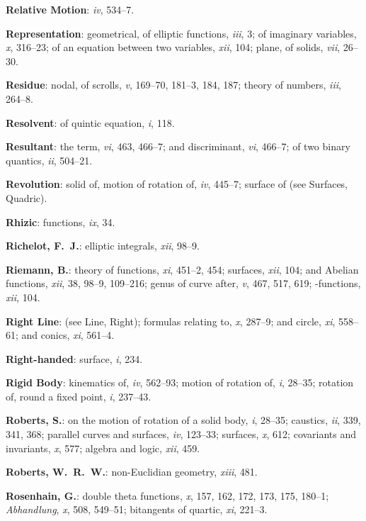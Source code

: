 \documentclass[11pt,a4paper]{article}
\newcommand{\IndexEntry}[1]{\textbf{#1}}
\newcommand{\V}[1]{\textit{#1}} %
\begin{document}
\IndexEntry{Relative Motion}: \V{iv}, 534--7.

\IndexEntry{Representation}: geometrical, of elliptic functions, \V{iii}, 3; of imaginary variables, \V{x}, 316--23; of an equation between two variables, \V{xii}, 104; plane, of solids, \V{vii}, 26--30.

\newpage

\setcounter{page}{121}

\IndexEntry{Residue}: nodal, of scrolls, \V{v}, 169--70, 181--3, 184, 187; theory of numbers, \V{iii}, 264--8.

\IndexEntry{Resolvent}: of quintic equation, \V{i}, 118.

\IndexEntry{Resultant}: the term, \V{vi}, 463, 466--7; and discriminant, \V{vi}, 466--7; of two binary quantics, \V{ii}, 504--21.

\IndexEntry{Revolution}: solid of, motion of rotation of, \V{iv}, 445--7; surface of (see Surfaces, Quadric).

\IndexEntry{Rhizic}: functions, \V{ix}, 34.

\IndexEntry{Richelot, F.\ J.}: elliptic integrals, \V{xii}, 98--9.

\IndexEntry{Riemann, B.}: theory of functions, \V{xi}, 451--2, 454; surfaces, \V{xii}, 104; and Abelian functions, \V{xii}, 38, 98--9, 109--216; genus of curve after, \V{v}, 467, 517, 619; \vartheta-functions, \V{xii}, 104.

\IndexEntry{Right Line}: (see Line, Right); formulas relating to, \V{x}, 287--9; and circle, \V{xi}, 558--61; and conics, \V{xi}, 561--4.

\IndexEntry{Right-handed}: surface, \V{i}, 234.

\IndexEntry{Rigid Body}: kinematics of, \V{iv}, 562--93; motion of rotation of, \V{i}, 28--35; rotation of, round a fixed point, \V{i}, 237--43.

\IndexEntry{Roberts, S.}: on the motion of rotation of a solid body, \V{i}, 28--35; caustics, \V{ii}, 339, 341, 368; parallel curves and surfaces, \V{iv}, 123--33; surfaces, \V{x}, 612; covariants and invariants, \V{x}, 577; algebra and logic, \V{xii}, 459.

\IndexEntry{Roberts, W.\ R.\ W.}: non-Euclidian geometry, \V{xiii}, 481.

\IndexEntry{Rosenhain, G.}: double theta functions, \V{x}, 157, 162, 172, 173, 175, 180--1; \textit{Abhandlung}, \V{x}, 508, 549--51; bitangents of quartic, \V{xi}, 221--3.
\end{document}
